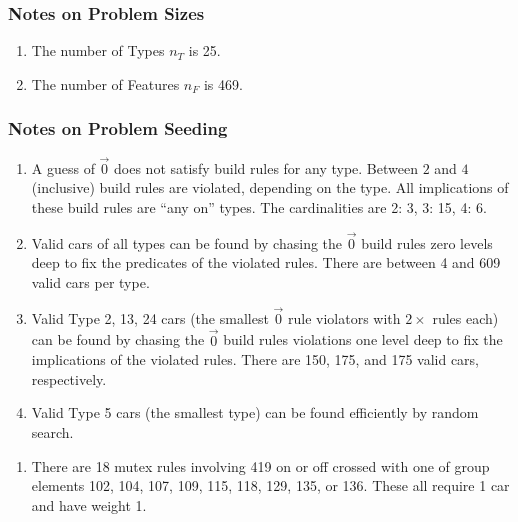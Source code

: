 \documentclass[aps,prl,twocolumn,superscriptaddress,groupedaddress]{revtex4}  %
\begin{document}
\subsubsection{Notes on Problem Sizes}

\begin{enumerate}
\item The number of Types $n_{T}$ is 25.
\item The number of Features $n_{F}$ is 469. 
\end{enumerate}

\subsubsection{Notes on Problem Seeding}

\begin{enumerate}
\item A guess of $\vec 0$ does not satisfy build rules for any type. Between $2$
and $4$ (inclusive) build rules are violated, depending on the type. All
implications of these build rules are ``any on'' types. The cardinalities are 2:
3, 3: 15, 4: 6.
\item Valid cars of all types can be found by chasing the $\vec 0$ build rules
zero levels deep to fix the predicates of the violated rules. There are between
4 and 609 valid cars per type.
\item Valid Type 2, 13, 24 cars (the smallest $\vec 0$ rule violators with
$2\times$ rules each) can be found by chasing the $\vec 0$ build rules
violations one level deep to fix the implications of the violated rules. There
are 150, 175, and 175 valid cars, respectively.
\item Valid Type 5 cars (the smallest type) can be found efficiently by random
search.
\end{enumerate}


\begin{enumerate}
\item There are 18 mutex rules involving 419 on or off crossed with one of group
elements 102, 104, 107, 109, 115, 118, 129, 135, or 136. These all require 1 car
and have weight 1.
\end{enumerate}

% 
% 
\end{document}
